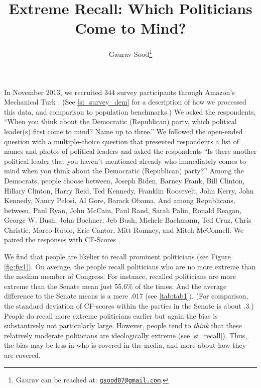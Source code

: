 \documentclass[12pt, letterpaper]{article}
\title{Extreme Recall: Which Politicians Come to Mind?\\\vspace{10mm}}
\author{Gaurav Sood\thanks{Gaurav can be reached at: \href{mailto:gsood07@gmail.com}{\texttt{gsood07@gmail.com}}.}}
\begin{document}
\maketitle

\doublespacing

In November 2013, we recruited 344 survey participants through Amazon's Mechanical Turk \citep[see][]{berinsky2012}. (See \ref{si_survey_dem} for a description of how we processed this data, and comparison to population benchmarks.) We asked the respondents, ``When you think about the Democratic (Republican) party, which political leader(s) first come to mind? Name up to three.'' We followed the open-ended question with a multiple-choice question that presented respondents a list of names and photos of political leaders and asked the respondents ``Is there another political leader that you haven't mentioned already who immediately comes to mind when you think about the Democratic (Republican) party?'' Among the Democrats, people choose between, Joseph Biden, Barney Frank, Bill Clinton, Hillary Clinton, Harry Reid, Ted Kennedy, Franklin Roosevelt, John Kerry, John Kennedy, Nancy Pelosi, Al Gore, Barack Obama. And among Republicans, between, Paul Ryan, John McCain, Paul Rand, Sarah Palin, Ronald Reagan, George W. Bush, John Boehner, Jeb Bush, Michele Bachmann, Ted Cruz, Chris Christie, Marco Rubio, Eric Cantor, Mitt Romney, and Mitch McConnell. We paired the responses with CF-Scores \citep{bonica2013}.

We find that people are likelier to recall prominent politicians (see Figure \ref{fig:fig1}). On average, the people recall politicians who are no more extreme than the median member of Congress. For instance, recalled politicians are more extreme than the Senate mean just 55.6\% of the times. And the average difference to the Senate means is a mere .017 (see \ref{tab:tab1}). (For comparison, the standard deviation of CF-scores within the parties in the Senate is about .3.) People do recall more extreme politicians earlier but again the bias is substantively not particularly large. However, people tend to \textit{think} that these relatively moderate politicians are ideologically extreme (see \ref{si_recall}). Thus, the bias may be less in who is covered in the media, and more about how they are covered.
\end{document}
